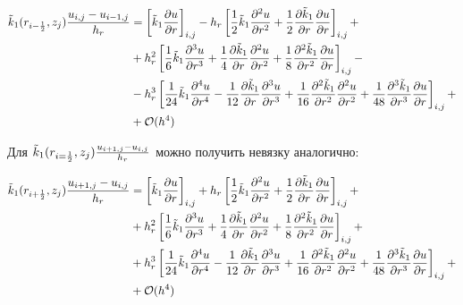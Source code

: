 \begin{align*}
  \Tilde{k}_1 (r_{i - \frac{1}{2}}, z_j) \frac{u_{i,j} - u_{i - 1, j}}{h_r} &= 
  \left[ \Tilde{k}_1 \frac{\partial u}{\partial r} \right]_{i, j} -
  h_r \left[ \frac{1}{2} \Tilde{k}_1 \frac{\partial^2 u}{\partial r^2} 
    + \frac{1}{2} \frac{\partial \Tilde{k}_1}{\partial r}\frac{\partial u}{\partial r}
  \right]_{i, j} +\\
  &+ h_r^2 \left[\frac{1}{6}\Tilde{k}_1\frac{\partial^3 u}{\partial r^3}
  + \frac{1}{4} \frac{\partial \Tilde{k}_1}{\partial r}\frac{\partial^2 u}{\partial r^2}
  + \frac{1}{8} \frac{\partial^2 \Tilde{k}_1}{\partial r^2}\frac{\partial u}{\partial r}
  \right]_{i, j} - \\
  &-h^3_r \left[
  \frac{1}{24} \Tilde{k}_1 \frac{\partial^4 u}{\partial r^4} - \frac{1}{12}\frac{\partial \Tilde{k}_1}{\partial r}\frac{\partial^3 u}{\partial r^3}
  + \frac{1}{16} \frac{\partial^2 \Tilde{k}_1}{\partial r^2}\frac{\partial^2 u}{\partial r^2}
  + \frac{1}{48} \frac{\partial^3 \Tilde{k}_1}{\partial r^3}\frac{\partial u}{\partial r}
  \right]_{i,j} +\\
  &+ \mathcal{O}(h^4)
\end{align*}

Для $ \Tilde{k}_1(r_{i = \frac{1}{2}}, z_j) \frac{u_{i + 1, j} - u_{i, j}}{h_r} $ можно получить невязку аналогично:

\begin{align*}
  \Tilde{k}_1(r_{i + \frac{1}{2}}, z_j) \frac{u_{i + 1, j} - u_{i, j}}{h_r} &= 
  \left[ \Tilde{k}_1 \frac{\partial u}{\partial r} \right]_{i, j} +
  h_r \left[ \frac{1}{2} \Tilde{k}_1 \frac{\partial^2 u}{\partial r^2} 
    + \frac{1}{2} \frac{\partial \Tilde{k}_1}{\partial r}\frac{\partial u}{\partial r}
  \right]_{i, j} +\\
  &+ h_r^2 \left[\frac{1}{6}\Tilde{k}_1\frac{\partial^3 u}{\partial r^3}
  + \frac{1}{4} \frac{\partial \Tilde{k}_1}{\partial r}\frac{\partial^2 u}{\partial r^2}
  + \frac{1}{8} \frac{\partial^2 \Tilde{k}_1}{\partial r^2}\frac{\partial u}{\partial r}
  \right]_{i, j} + \\
  &+ h^3_r \left[
  \frac{1}{24} \Tilde{k}_1 \frac{\partial^4 u}{\partial r^4} - \frac{1}{12}\frac{\partial \Tilde{k}_1}{\partial r}\frac{\partial^3 u}{\partial r^3}
  + \frac{1}{16} \frac{\partial^2 \Tilde{k}_1}{\partial r^2}\frac{\partial^2 u}{\partial r^2}
  + \frac{1}{48} \frac{\partial^3 \Tilde{k}_1}{\partial r^3}\frac{\partial u}{\partial r}
  \right]_{i,j} +\\
  &+ \mathcal{O}(h^4)
\end{align*}

